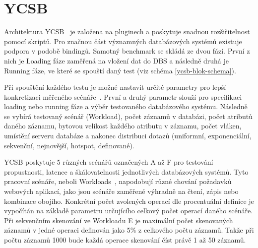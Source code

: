 \documentclass[czech,master,dept460,male,csharp,cpdeclaration]{diploma}
\begin{document}
	\section{YCSB} \label{lab-ycsb}
	
	Architektura YCSB~\cite{ycsb,ycsb-benchmarking} je založena na pluginech a poskytuje snadnou rozšiřitelnost pomocí skriptů. Pro značnou část významných databázových systémů existuje podpora v podobě bindingů. Samotný benchmark se skládá ze dvou fází. První z nich je Loading fáze zaměřená na vložení dat do DBS a následně druhá je Running fáze, ve které se spouští daný test (viz schéma \ref{ycsb-blok-schema}).
	
	Při spouštění každého testu je možné nastavit určité parametry pro lepší konkretizaci měřeného scénáře~\cite{ytb-ycsb}. První a druhý parametr slouží pro specifikaci loading nebo running fáze a výběr testovaného databázového systému. Následně se vybírá testovaný scénář (Workload), počet záznamů v databázi, počet atributů daného záznamu, bytovou velikost každého atributu v záznamu, počet vláken, umístění serveru databáze a nakonec distribuci dotazů (uniformní, exponenciální, sekvenční, nejnovější, hotspot, definované).
	
	YCSB poskytuje 5 různých scénářů označených A až F pro testování propustnosti, latence a škálovatelnosti jednotlivých databázových systémů. Tyto pracovní scénáře, neboli Workloads~\cite{benchmark-pdf-1, workloads}, napodobují různé chování požadavků webových aplikací, jako jsou scénáře zaměřené výhradně na čtení, zápis nebo kombinace obojího. Konkrétní počet zvolených operací dle procentuální definice je vypočítán na základě parametru určujícího celkový počet operací daného scénáře. Při sekvenčním skenování ve Workloadu E je maximální počet skenovaných záznamů v jedné operaci definován jako 5\% z celkového počtu záznamů. Takže při počtu záznamů 1000 bude každá operace skenování číst právě 1 až 50 záznamů.
	
\end{document}
